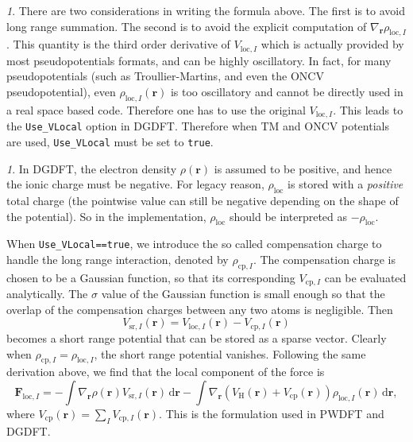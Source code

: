 \documentclass{article}
\newcommand{\bvec}[1]{\mathbf{#1}}
\newcommand{\vr}{\bvec{r}}
\newcommand{\vF}{\bvec{F}}
\newcommand{\ud}{\,\mathrm{d}}
\theoremstyle{plain}
\theoremstyle{remark}
\newtheorem{rem}[thm]{\protect\remarkname}
\theoremstyle{plain}
\theoremstyle{plain}
\theoremstyle{plain}
\providecommand{\remarkname}{Remark}
\begin{document}
\begin{rem}
There are two considerations in writing the formula above. The first is to avoid long range summation. The second is to avoid the explicit computation of $\nabla_\vr \rho_{\text{loc},I}$. This quantity is the third order derivative of $V_{\text{loc},I}$ which is actually provided by most pseudopotentials formats, and can be highly oscillatory.
In fact, for many pseudopotentials (such as Troullier-Martins, and even the ONCV pseudopotential), even $\rho_{\text{loc},I}(\vr)$ is too oscillatory and cannot be directly used in a real space based code. Therefore one has to use the original $V_{\text{loc},I}$. This leads to the \texttt{Use\_VLocal} option in DGDFT. Therefore when TM and ONCV potentials are used, \texttt{Use\_VLocal} must be set to \texttt{true}.
\end{rem}

\begin{rem}
In DGDFT, the electron density $\rho(\vr)$ is assumed to be positive, and hence the ionic charge must be negative. For legacy reason, $\rho_{\text{loc}}$ is stored with a  \textit{positive} total charge (the pointwise value can still be negative depending on the shape of the potential). So in the implementation, $\rho_{\text{loc}}$ should be interpreted as $-\rho_{\text{loc}}$. 
\end{rem}

When \texttt{Use\_VLocal==true}, we introduce the so called compensation charge to handle the long range interaction, denoted by $\rho_{\text{cp},I}$. The compensation charge is chosen to be a Gaussian function, so that its corresponding $V_{\text{cp},I}$ can be evaluated analytically. The $\sigma$ value of the Gaussian function is small enough so that the overlap of the compensation charges between any two atoms is negligible. Then 
\[
V_{\text{sr},I}(\vr)=V_{\text{loc},I}(\vr)-V_{\text{cp},I}(\vr)
\] 
becomes a short range potential that can be stored as a sparse vector. Clearly when $\rho_{\text{cp},I}=\rho_{\text{loc},I}$, the short range potential vanishes. Following the same derivation above, we find that the local component of the force is
\begin{equation}
\vF_{\text{loc},I}=- \int  \nabla_\vr \rho(\vr) V_{\text{sr},I}(\vr) \ud \vr-
    \int  \nabla_\vr (V_{\text{H}}(\vr)+V_{\text{cp}}(\vr)) \rho_{\text{loc},I}(\vr) \ud \vr,
\label{eqn:force_loc3}
\end{equation}
where $V_{\text{cp}}(\vr)=\sum_{I}V_{\text{cp},I}(\vr)$. This is the formulation used in PWDFT and DGDFT. 
\end{document}
